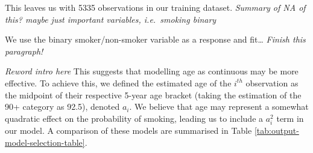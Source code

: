 \documentclass[
  11pt,
]{article}
\begin{document}
This leaves us with 5335 observations in our training dataset.
\emph{Summary of NA of this? maybe just important variables,
i.e.~smoking binary}

We use the binary smoker/non-smoker variable as a response and
fit\ldots{} \emph{Finish this paragraph!}

\emph{Reword intro here} This suggests that modelling age as continuous
may be more effective. To achieve this, we defined the estimated age of
the \(i^{th}\) observation as the midpoint of their respective 5-year
age bracket (taking the estimation of the 90+ category as 92.5), denoted
\(a_i\). We believe that age may represent a somewhat quadratic effect
on the probability of smoking, leading us to include a \(a_i^2\) term in
our model. A comparison of these models are summarised in Table
\ref{tab:output-model-selection-table}.
\end{document}
